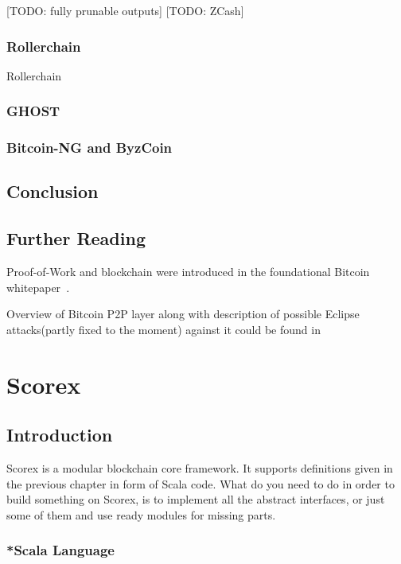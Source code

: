 \documentclass[]{report}   %
\begin{document}
[TODO: fully prunable outputs]
[TODO: ZCash]

\subsection{Rollerchain}

Rollerchain 

\subsection{GHOST}

\subsection{Bitcoin-NG and ByzCoin}

\section{Conclusion}


\section{Further Reading}

Proof-of-Work and blockchain were introduced in the foundational Bitcoin whitepaper~\cite{Nakamoto2008}.

Overview of Bitcoin P2P layer along with description of possible Eclipse attacks(partly fixed to the moment) against it could be found in~\cite{heilman2015eclipse}


\chapter{Scorex}           %
\section{Introduction}     %

Scorex is a modular blockchain core framework. It supports definitions given in the previous chapter in form of Scala code. What do you need to do in order to build something on Scorex, is to implement all the abstract interfaces, or just some of them and use ready modules for missing parts.



\subsection{*Scala Language}         %
\end{document}
